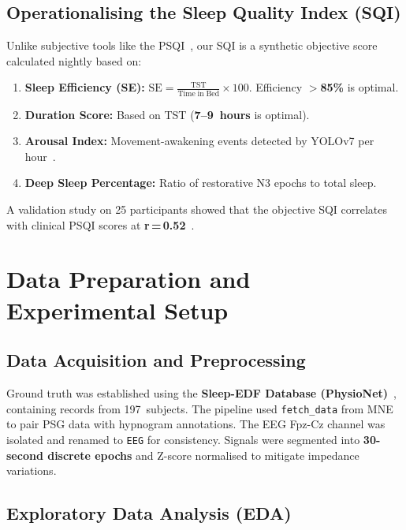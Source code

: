 \documentclass[10pt, a4paper, twocolumn]{article}
\begin{document}
\subsection{Operationalising the Sleep Quality Index (SQI)}

Unlike subjective tools like the PSQI~\cite{ref8}, our SQI is a synthetic objective
score calculated nightly based on:

\begin{enumerate}[leftmargin=1.2em, itemsep=2pt]
  \item \textbf{Sleep Efficiency (SE):}
    $\displaystyle\mathrm{SE} = \frac{\mathrm{TST}}{\mathrm{Time\;in\;Bed}} \times 100$.
    Efficiency \textbf{$>$85\%} is optimal.

  \item \textbf{Duration Score:} Based on TST (\textbf{7--9~hours} is optimal).

  \item \textbf{Arousal Index:} Movement-awakening events detected by YOLOv7 per
    hour~\cite{ref9}.

  \item \textbf{Deep Sleep Percentage:} Ratio of restorative N3 epochs to total
    sleep.
\end{enumerate}

A validation study on 25 participants showed that the objective SQI correlates with
clinical PSQI scores at \textbf{r\,=\,0.52}~\cite{ref7}.

\section{Data Preparation and Experimental Setup}

\subsection{Data Acquisition and Preprocessing}

Ground truth was established using the \textbf{Sleep-EDF Database
(PhysioNet)}~\cite{ref5}, containing records from 197~subjects. The pipeline used
\texttt{fetch\_data} from MNE to pair PSG data with hypnogram annotations. The EEG
Fpz-Cz channel was isolated and renamed to \texttt{EEG} for consistency. Signals
were segmented into \textbf{30-second discrete epochs} and Z-score normalised to
mitigate impedance variations.

\subsection{Exploratory Data Analysis (EDA)}
\end{document}
